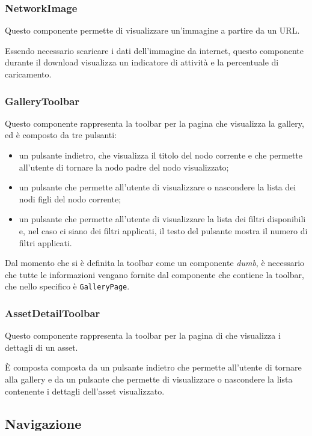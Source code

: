 \subsubsection{NetworkImage}

Questo componente permette di visualizzare un'immagine a partire da un URL.

Essendo necessario scaricare i dati dell'immagine da internet, questo componente durante il download visualizza un indicatore di attività e la percentuale di caricamento.

\subsubsection{GalleryToolbar}

Questo componente rappresenta la toolbar per la pagina che visualizza la gallery, ed è composto da tre pulsanti:
\begin{itemize}
\item un pulsante indietro, che visualizza il titolo del nodo corrente e che permette all'utente di tornare la nodo padre del nodo visualizzato;
\item un pulsante che permette all'utente di visualizzare o nascondere la lista dei nodi figli del nodo corrente;
\item un pulsante che permette all'utente di visualizzare la lista dei filtri disponibili e, nel caso ci siano dei filtri applicati, il testo del pulsante mostra il numero di filtri applicati.
\end{itemize}

Dal momento che si è definita la toolbar come un componente \textit{dumb}, è necessario che tutte le informazioni vengano fornite dal componente che contiene la toolbar, che nello specifico è \texttt{GalleryPage}.

\subsubsection{AssetDetailToolbar}

Questo componente rappresenta la toolbar per la pagina di che visualizza i dettagli di un asset.

\`E composta composta da un pulsante indietro che permette all'utente di tornare alla gallery e da un pulsante che permette di visualizzare o nascondere la lista contenente i dettagli dell'asset visualizzato.

\subsection{Navigazione}

